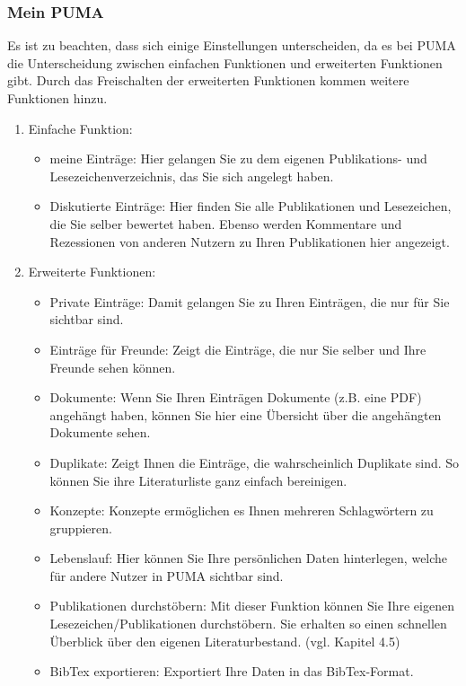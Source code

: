 \subsubsection{Mein PUMA}
Es ist zu beachten, dass sich einige Einstellungen unterscheiden, da es bei PUMA die Unterscheidung zwischen einfachen Funktionen und erweiterten Funktionen gibt. Durch das Freischalten der erweiterten Funktionen kommen weitere Funktionen hinzu.
\begin{enumerate}
    \item Einfache Funktion:
    \begin{itemize}
        \item meine Einträge: Hier gelangen Sie zu dem eigenen Publikations- und Lesezeichenverzeichnis, das Sie sich angelegt haben.
        \item Diskutierte Einträge: Hier finden Sie alle Publikationen und Lesezeichen, die Sie selber bewertet haben. Ebenso werden Kommentare und Rezessionen von anderen Nutzern zu Ihren Publikationen hier angezeigt.
    \end{itemize}
    \item Erweiterte Funktionen:
    \begin{itemize}
        \item Private Einträge: Damit gelangen Sie zu Ihren Einträgen, die nur für Sie sichtbar sind. 
        \item Einträge für Freunde: Zeigt die Einträge, die nur Sie selber und Ihre Freunde sehen können.
        \item Dokumente: Wenn Sie Ihren Einträgen Dokumente (z.B. eine PDF) angehängt haben, können Sie hier eine Übersicht über die angehängten Dokumente sehen.
        \item Duplikate: Zeigt Ihnen die Einträge, die wahrscheinlich Duplikate sind. So können Sie ihre Literaturliste ganz einfach bereinigen. 
        \item Konzepte: Konzepte ermöglichen es Ihnen mehreren Schlagwörtern zu gruppieren. %
        \item Lebenslauf: Hier können Sie Ihre persönlichen Daten hinterlegen, welche für andere Nutzer in PUMA sichtbar sind.
        \item Publikationen durchstöbern: Mit dieser Funktion können Sie Ihre eigenen Lesezeichen/Publikationen durchstöbern. Sie erhalten so einen schnellen Überblick über den eigenen Literaturbestand. (vgl. Kapitel 4.5)
        \item BibTex exportieren: Exportiert Ihre Daten in das BibTex-Format.
    \end{itemize}
\end{enumerate}

